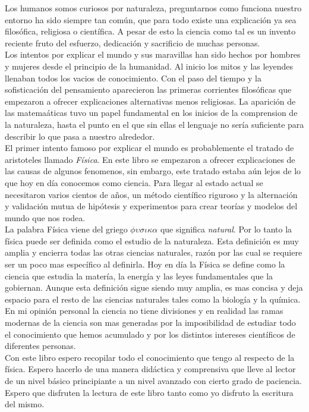 Los humanos somos curiosos por naturaleza, preguntarnos como funciona nuestro entorno ha sido siempre tan com\'un, que para todo existe una explicaci\'on ya sea filos\'ofica, religiosa o cient\'ifica. A pesar de esto la ciencia como tal es un invento reciente fruto del esfuerzo, dedicaci\'on y sacrificio de muchas personas.\\
Los intentos por explicar el mundo y sus maravillas han sido hechos por hombres y mujeres desde el principio de la humanidad. Al inicio los mitos y las leyendes llenaban todos los vacios de conocimiento. Con el paso del tiempo y la sofisticaci\'on del pensamiento aparecieron las primeras corrientes filos\'oficas que empezaron a ofrecer explicaciones alternativas menos religiosas. La aparici\'on de las matema\'aticas tuvo un papel fundamental en los inicios de la comprension de la naturaleza, hasta el punto en el que sin ellas el lenguaje no ser\'ia suficiente para describir lo que pasa a nuestro alrededor.\\
El primer intento famoso por explicar el mundo es probablemente el tratado de aristoteles llamado \textit{F\'isica}. En este libro se empezaron a ofrecer explicaciones de las causas de algunos fenomenos, sin embargo, este tratado estaba a\'un lejos de lo que hoy en d\'ia conocemos como ciencia. Para llegar al estado actual se necesitaron varios cientos de a\~nos, un m\'etodo cient\'ifico riguroso y la alternaci\'on y validaci\'on mutua de hip\'otesis y experimentos para crear teor\'ias y modelos del mundo que nos rodea.\\
La palabra F\'isica viene del griego $\phi\upsilon\sigma\iota\kappa\alpha$ que significa \textit{natural}. Por lo tanto la f\'isica puede ser definida como el estudio de la naturaleza. Esta definici\'on es muy amplia y encierra todas las otras ciencias naturales, raz\'on por las cual se requiere ser un poco mas espec\'ifico al definirla. Hoy en d\'ia la F\'isica se define como la ciencia que estudia la mater\'ia, la energ\'ia y las leyes fundamentales que la gobiernan. Aunque esta definici\'on sigue siendo muy amplia, es mas concisa y deja espacio para el resto de las ciencias naturales tales como la biolog\'ia y la qu\'imica. En mi opini\'on personal la ciencia no tiene divisiones y en realidad las ramas modernas de la ciencia son mas generadas por la imposibilidad de estudiar todo el conocimiento que hemos acumulado y por los distintos intereses cient\'ificos de diferentes personas.\\
Con este libro espero recopilar todo el conocimiento que tengo al respecto de la f\'isica. Espero hacerlo de una manera did\'actica y comprensiva que lleve al lector de un nivel b\'asico principiante a un nivel avanzado con cierto grado de paciencia. Espero que disfruten la lectura de este libro tanto como yo disfruto la escritura del mismo.\\ 
